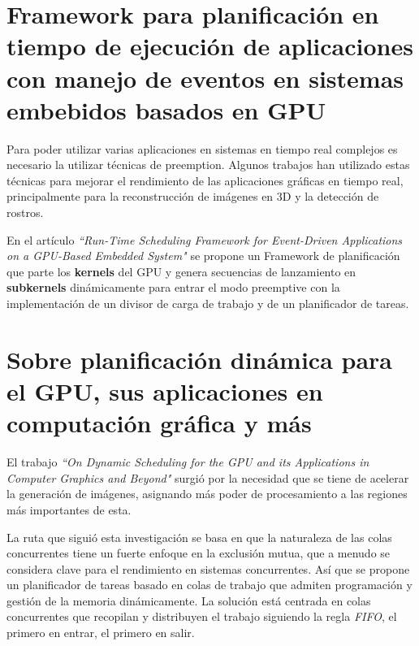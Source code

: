 \section{Framework para planificación en tiempo de ejecución de aplicaciones con manejo de eventos en sistemas embebidos basados en GPU }

Para poder utilizar varias aplicaciones en sistemas en tiempo real complejos es necesario la utilizar técnicas de preemption. Algunos trabajos han utilizado estas técnicas para mejorar el rendimiento de las aplicaciones gráficas en tiempo real, principalmente para la reconstrucción de imágenes en 3D y la detección de rostros.

\vspace{0.3cm}

En el artículo \textit{``Run-Time Scheduling Framework for Event-Driven Applications on a GPU-Based Embedded System"}\cite{RTFG} se propone un Framework de planificación que parte los \textbf{kernels} del GPU y genera secuencias de lanzamiento en \textbf{subkernels} dinámicamente para entrar el modo preemptive con la implementación de un divisor de carga de trabajo y de un planificador de tareas. 

\section{Sobre planificación dinámica para el GPU, sus aplicaciones en computación gráfica y más}

El trabajo \textit{``On Dynamic Scheduling for the GPU and its Applications in Computer Graphics and Beyond"}\cite{DynSche} surgió por la necesidad que se tiene de acelerar la generación de imágenes, asignando más poder de procesamiento a las regiones más importantes de esta.

\vspace{0.3cm}
La ruta que siguió esta investigación se basa en que la naturaleza de las colas concurrentes tiene un fuerte enfoque en la exclusión mutua, que a menudo se considera clave para el rendimiento en sistemas concurrentes. Así que se propone un planificador de tareas basado en colas de trabajo que admiten programación y gestión de la memoria dinámicamente. La solución está centrada en colas concurrentes que recopilan y distribuyen el trabajo siguiendo la regla \textit{FIFO}, el primero en entrar, el primero en salir. 

